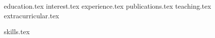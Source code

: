 \documentclass[letterpaper,11pt]{article}
\begin{document}


{education.tex}
{interest.tex}
{experience.tex}
{publications.tex}
{teaching.tex}
{extracurricular.tex}
                 
{skills.tex}

\end{document}
